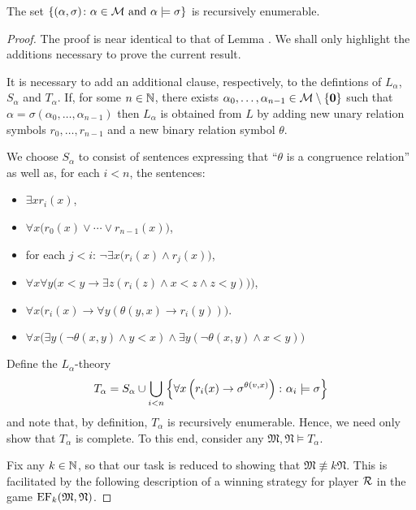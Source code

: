 \begin{lem}\label{lem:relin}
	The set $\left\lbrace (\alpha,\sigma)\colon \alpha\in\mathcal{M}\text{ and }\alpha\models\sigma \right\rbrace$ is recursively enumerable.
\end{lem}
\begin{proof}
	The proof is near identical to that of Lemma \label{lem:rescat}.  We shall only highlight the additions necessary to prove the current result.

	It is necessary to add an additional clause, respectively, to the defintions of $L_\alpha$, $S_\alpha$ and $T_\alpha$.  If, for some $n\in\mathbb{N}$, there exists $\alpha_0,\dotsc,\alpha_{n-1}\in\mathcal{M}\setminus\left\lbrace \mathbf{0}\right\rbrace$ such that $\alpha=\sigma(\alpha_0,\dotsc,\alpha_{n-1})$ then $L_\alpha$ is obtained from $L$ by adding new unary relation symbols $r_0,\dotsc,r_{n-1}$ and a new binary relation symbol $\theta$.

	We choose $S_\alpha$ to consist of sentences expressing that ``$\theta$ is a congruence relation'' as well as, for each $i<n$, the sentences:
	\begin{itemize}
		\item	$\exists x r_i(x)$,
		\item	$\forall x\big(r_0(x)\vee\dotsb\vee r_{n-1}(x)\big)$,
		\item	for each $j<i$: $\neg\exists x\big(r_i(x)\wedge r_j(x)\big)$,
		\item	$\forall x\forall y\big(x<y\rightarrow\exists z(r_i(z)\wedge x<z \wedge z<y))\big)$,
		\item	$\forall x\big(r_i(x)\rightarrow\forall y(\theta(y,x)\rightarrow r_i(y))\big)$.
		\item	$\forall x\big(\exists y(\neg\theta(x,y)\wedge y<x)\wedge\exists y(\neg\theta(x,y)\wedge x<y)\big)$
	\end{itemize}

	Define the $L_\alpha$-theory
	\begin{equation}
		T_\alpha=S_\alpha\cup\bigcup_{i<n}\left\lbrace \forall x\left(r_i(x)\rightarrow\sigma^{\theta(v,x)}\right)\colon \alpha_i\models\sigma \right\rbrace
	\end{equation}
	and note that, by definition, $T_\alpha$ is recursively enumerable.  Hence, we need only show that $T_\alpha$ is complete.  To this end, consider any $\mathfrak{M},\mathfrak{N}\models T_\alpha$.

	Fix any $k\in\mathbb{N}$, so that our task is reduced to showing that $\mathfrak{M}\nequiv{k}\mathfrak{N}$.  This is facilitated by the following description of a winning strategy for player $\mathcal{R}$ in the game $\operatorname{EF}_k(\mathfrak{M},\mathfrak{N})$.


\end{proof}
